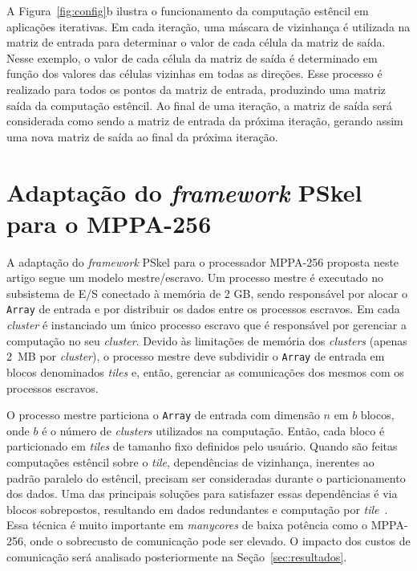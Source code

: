 \documentclass[12pt]{article}
\newcommand{\fw}{\textit{framework}\xspace}
\newcommand{\pskel}{PSkel\xspace}
\newcommand{\mppa}{MPPA-256\xspace}
\begin{document}
A Figura~\ref{fig:config}b ilustra o funcionamento da computação estêncil em
aplicações iterativas. Em cada iteração, uma máscara de vizinhança é utilizada
na matriz de entrada para determinar o valor de cada célula da matriz de saída.
Nesse exemplo, o valor de cada célula da matriz de saída é determinado em função
dos valores das células vizinhas em todas as direções. Esse processo é realizado
para todos os pontos da matriz de entrada, produzindo uma matriz saída da
computação estêncil. Ao final de uma iteração, a matriz de saída será
considerada como sendo a matriz de entrada da próxima iteração, gerando assim
uma nova matriz de saída ao final da próxima iteração.

\section{Adaptação do \fw \pskel para o \mppa}
\label{sec:pskelMPPA}

A adaptação do \fw \pskel para o processador \mppa proposta neste artigo segue
um modelo mestre/escravo. Um processo mestre é executado no subsistema de E/S
conectado à memória \lpddr de 2 GB, sendo responsável por alocar o
\texttt{Array} de entrada e por distribuir os dados entre os processos escravos.
Em cada \textit{cluster} é instanciado um único processo escravo que é
responsável por gerenciar a computação no seu \textit{cluster}. Devido às
limitações de memória dos \textit{clusters} (apenas 2~MB por \textit{cluster}),
o processo mestre deve subdividir o \texttt{Array} de entrada em blocos
denominados \textit{tiles} e, então, gerenciar as comunicações dos mesmos com os
processos escravos.

O processo mestre particiona o \texttt{Array} de entrada com dimensão $n$ em $b$
blocos, onde $b$ é o número de \textit{clusters} utilizados na computação.
Então, cada bloco é particionado em \textit{tiles} de tamanho fixo definidos
pelo usuário. Quando são feitas computações estêncil sobre o \textit{tile},
dependências de vizinhança, inerentes ao padrão paralelo do estêncil, precisam
ser consideradas durante o particionamento dos dados. Uma das principais
soluções para satisfazer essas dependências é via blocos sobrepostos, resultando
em dados redundantes e computação por
\textit{tile}~\cite{meng11,holewinski12,rocha17}. Essa técnica é muito
importante em \textit{manycores} de baixa potência como o \mppa, onde o
sobrecusto de comunicação pode ser elevado. O impacto dos custos de comunicação
será analisado posteriormente na Seção~\ref{sec:resultados}.
\end{document}
